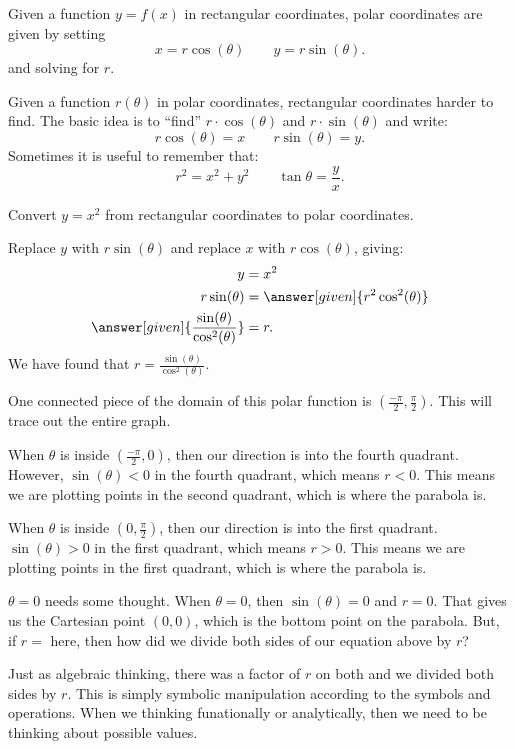 \documentclass{ximera}
\begin{document}
Given a function $y=f(x)$ in rectangular coordinates, polar coordinates
are given by setting
\[
x=r\cos(\theta)\qquad y=r\sin(\theta).
\]
and solving for $r$.

Given a function $r(\theta)$ in polar coordinates, rectangular
coordinates harder to find. The basic idea is to ``find'' $r\cdot
\cos(\theta)$ and $r\cdot \sin(\theta)$ and write:
\[
r\cos(\theta) = x\qquad r\sin(\theta) = y.
\]
Sometimes it is useful to remember that:
\[
r^2=x^2+y^2\qquad \tan \theta = \frac yx.
\]


\begin{example}
  Convert $y=x^2$ from rectangular coordinates to polar coordinates.
  \begin{explanation}
    Replace $y$ with $r\sin(\theta)$ and replace $x$ with $r\cos(\theta)$, giving:
      \begin{align*}
	y &=x^2\\
	r\sin(\theta) &= \answer[given]{r^2\cos^2(\theta)}\\
	\answer[given]{\frac{\sin(\theta)}{\cos^2(\theta)}}  &= r.
      \end{align*}
      We have found that $r=\frac{\sin(\theta)}{\cos^2(\theta)}$. 

      One connected piece of the domain of this polar function is $\left( \frac{-\pi}{2}, \frac{\pi}{2} \right)$. This will trace out the entire graph.


      \begin{warning}
      When $\theta$ is inside $\left( \frac{-\pi}{2}, 0 \right)$, then our direction is into the fourth quadrant.  However, $\sin(\theta) < 0$ in the fourth quadrant, which means $r < 0$.  This means we are plotting points in the second quadrant, which is where the parabola is.


      When $\theta$ is inside $\left( 0, \frac{\pi}{2} \right)$, then our direction is into the first quadrant.   $\sin(\theta) > 0$ in the first quadrant, which means $r > 0$.  This means we are plotting points in the first quadrant, which is where the parabola is.


      $\theta = 0$ needs some thought.  When $\theta = 0$, then $\sin(\theta) = 0$ and $r = 0$.  That gives us the Cartesian point $(0,0)$, which is the bottom point on the parabola.  But, if $r =$ here, then how did we divide both sides of our equation above by $r$?

      Just as algebraic thinking, there was a factor of $r$ on both and we divided both sides by $r$.  This is simply symbolic manipulation according to the symbols and operations.  When we thinking funationally or analytically, then we need to be thinking about possible values.


\end{warning}
\end{explanation}
\end{example}
\end{document}
